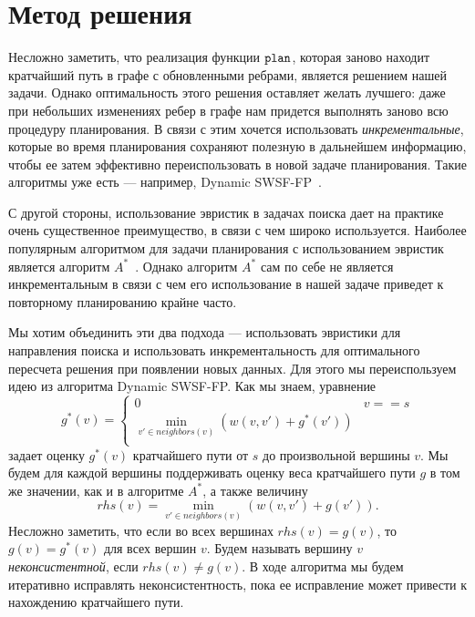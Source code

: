 \documentclass[11pt]{article}
\begin{document}
    \section{Метод решения}

    Несложно заметить, что реализация функции \(\mathtt{plan}\), которая заново находит кратчайший путь в графе с обновленными ребрами, является решением нашей задачи.
    Однако оптимальность этого решения оставляет желать лучшего: даже при небольших изменениях ребер в графе нам придется выполнять заново всю процедуру планирования.
    В связи с этим хочется использовать \textit{инкрементальные}, которые во время планирования сохраняют полезную в дальнейшем информацию, чтобы ее затем эффективно переиспользовать в новой задаче планирования.
    Такие алгоритмы уже есть --- например, Dynamic SWSF-FP~\cite{RAMALINGAM1996267}.

    С другой стороны, использование эвристик в задачах поиска дает на практике очень существенное преимущество, в связи с чем широко используется.
    Наиболее популярным алгоритмом для задачи планирования с использованием эвристик является алгоритм $A^*$~\cite{Nilsson1971ProblemsolvingMI}.
    Однако алгоритм $A^*$ сам по себе не является инкрементальным в связи с чем его использование в нашей задаче приведет к повторному планированию крайне часто.

    Мы хотим объединить эти два подхода --- использовать эвристики для направления поиска и использовать инкрементальность для оптимального пересчета решения при появлении новых данных.
    Для этого мы переиспользуем идею из алгоритма Dynamic SWSF-FP.
    Как мы знаем, уравнение \[ g^*(v) = \begin{cases}
                                            0 &  v == s\\
                                            \min_{v' \in neighbors(v)} (w(v, v') + g^*(v')) \\
    \end{cases} \]
    задает оценку $g^*(v)$ кратчайшего пути от $s$ до произвольной вершины $v$.
    Мы будем для каждой вершины поддерживать оценку веса кратчайшего пути $g$ в том же значении, как и в алгоритме $A^*$, а также
    величину \[rhs(v) = \min_{v' \in neighbors(v)} (w(v, v') + g(v')). \]
    Несложно заметить, что если во всех вершинах $rhs(v) = g(v)$, то $g(v) = g^*(v)$ для всех вершин $v$.
    Будем называть вершину $v$ \textit{неконсистентной}, если $rhs(v) \neq g(v)$.
    В ходе алгоритма мы будем итеративно исправлять неконсистентность, пока ее исправление может привести к нахождению кратчайшего пути.
\end{document}
